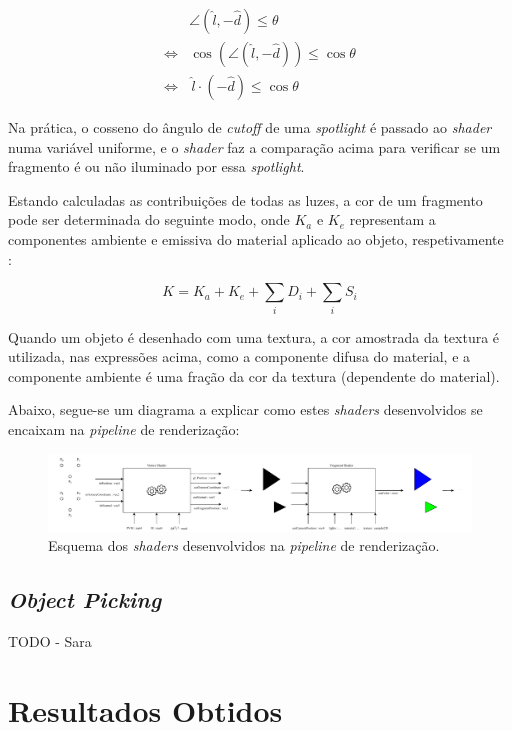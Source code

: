 \documentclass[12pt, a4paper]{article}
\begin{document}
\begin{align*}
    & \angle (\hat{l}, -\hat{d}) \le \theta \\
    \Leftrightarrow & \cos \left ( \angle (\hat{l}, -\hat{d}) \right ) \le \cos \theta \\
    \Leftrightarrow & \, \hat{l} \cdot (-\hat{d}) \le \cos \theta
\end{align*}

Na prática, o cosseno do ângulo de \emph{cutoff} de uma \emph{spotlight} é passado ao \emph{shader}
numa variável uniforme, e o \emph{shader} faz a comparação acima para verificar se um fragmento é
ou não iluminado por essa \emph{spotlight}.

Estando calculadas as contribuições de todas as luzes, a cor de um fragmento pode ser determinada do
seguinte modo, onde $K_a$ e $K_e$ representam a componentes ambiente e emissiva do material aplicado
ao objeto, respetivamente \cite{learn-opengl-1} \cite{learn-opengl-3}:

$$
K = K_a + K_e + \sum_{i} D_i + \sum_{i} S_i
$$

Quando um objeto é desenhado com uma textura, a cor amostrada da textura é utilizada, nas
expressões acima, como a componente difusa do material, e a componente ambiente é uma fração da cor
da textura (dependente do material).

Abaixo, segue-se um diagrama a explicar como estes \emph{shaders} desenvolvidos se encaixam na
\emph{pipeline} de renderização:

\begin{figure}[H]
    \centering
    \includegraphics[width=\textwidth]{res/phase4/Shaders.pdf}
    \caption{Esquema dos \emph{shaders} desenvolvidos na \emph{pipeline} de renderização.}
\end{figure}

\subsection{\emph{Object Picking}}

{\color{red} TODO - Sara}

\section{Resultados Obtidos}
\end{document}
